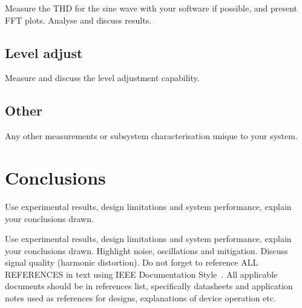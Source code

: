 \documentclass[11pt,a4paper]{article}
\begin{document}
Measure the THD for the sine wave with your software if possible, and present FFT plots. Analyse and discuss results.

\subsection{Level adjust}

Measure and discuss the level adjustment capability.

\subsection{Other}

Any other measurements or subsystem characterisation unique to your system.


\newpage
\section{Conclusions}
Use experimental results, design limitations and system performance, explain your conclusions drawn.

Use experimental results, design limitations and system performance, explain your conclusions drawn.
Highlight noise, oscillations and mitigation. Discuss signal quality (harmonic distortion).
Do not forget to reference ALL REFERENCES in text using IEEE Documentation Style~\cite{IEEErefguide:2023}.
All applicable documents should be in references list, specifically datasheets and application notes \cite{lm555:2014} used as references for designs, explanations of device operation etc.



\clearpage %




\end{document}
